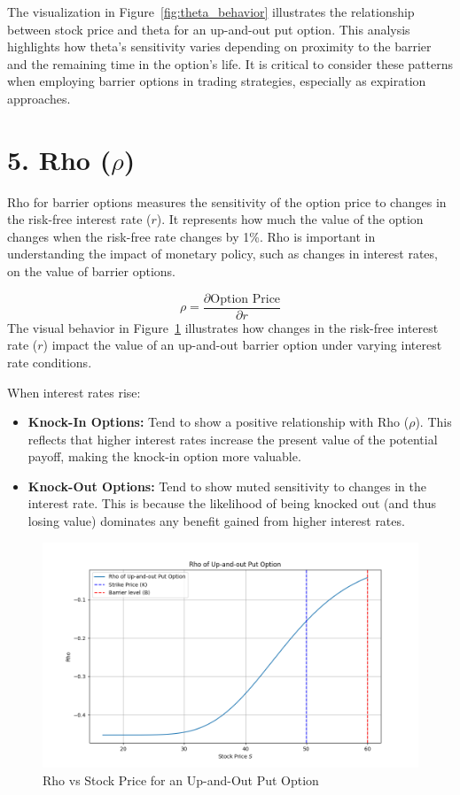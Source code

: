 The visualization in Figure~\ref{fig:theta_behavior} illustrates the relationship between stock price and theta for an up-and-out put option. This analysis highlights how theta's sensitivity varies depending on proximity to the barrier and the remaining time in the option's life. It is critical to consider these patterns when employing barrier options in trading strategies, especially as expiration approaches.


\section*{5. Rho (\(\rho\))}

Rho for barrier options measures the sensitivity of the option price to changes in the risk-free interest rate (\(r\)). It represents how much the value of the option changes when the risk-free rate changes by 1\%. Rho is important in understanding the impact of monetary policy, such as changes in interest rates, on the value of barrier options.

\[
\rho = \frac{\partial \text{Option Price}}{\partial r}
\]
The visual behavior in Figure~\ref{fig:rho_behavior} illustrates how changes in the risk-free interest rate (\(r\)) impact the value of an up-and-out barrier option under varying interest rate conditions. 

When interest rates rise:
\begin{itemize}
    \item \textbf{Knock-In Options:} Tend to show a positive relationship with Rho (\(\rho\)). This reflects that higher interest rates increase the present value of the potential payoff, making the knock-in option more valuable.
    \item \textbf{Knock-Out Options:} Tend to show muted sensitivity to changes in the interest rate. This is because the likelihood of being knocked out (and thus losing value) dominates any benefit gained from higher interest rates.
\end{itemize}

\begin{figure}[h]
    \centering
    \includegraphics[width=.65\linewidth]{content/images/rho.png}
    \caption{Rho vs Stock Price for an Up-and-Out Put Option}
    \label{fig:rho_behavior}
\end{figure}



